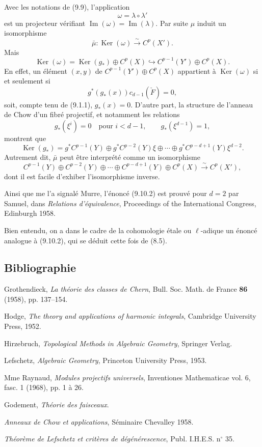 \documentclass[11pt]{article}
\providecommand{\Ker}{\operatorname{Ker}}
\providecommand{\Ker}{\operatorname{Ker}}
\providecommand{\Ker}{\operatorname{Ker}}
\begin{document}
Avec les notations de (9.9), l'application
\[
\omega=\lambda\circ\lambda'
\]
est un projecteur vérifiant $\operatorname{Im}(\omega)=\operatorname{Im}(\lambda)$. Par suite $\mu$ induit un isomorphisme
\[
\bar\mu:\Ker(\omega)\xrightarrow{\sim}C^p(X').
\]
Mais
\[
\Ker(\omega)=\Ker(g_*)\oplus C^p(X)\hookrightarrow C^{p-1}(Y')\oplus C^p(X).
\tag{9.10.1}
\]
En effet, un élément $(x,y)$ de $C^{p-1}(Y')\oplus C^p(X)$ appartient à $\Ker(\omega)$ si et seulement si
\[
g^*(g_*(x))c_{d-1}(\check F)=0,
\]
soit, compte tenu de (9.1.1), $g_*(x)=0$. D'autre part, la structure de l'anneau de Chow d'un fibré projectif, et notamment les relations
\[
g_*(\xi^i)=0\quad\text{pour }i<d-1,\qquad g_*(\xi^{d-1})=1,
\]
montrent que
\[
\Ker(g_*)=g^*C^{p-1}(Y)\oplus g^*C^{p-2}(Y)\xi\oplus\cdots\oplus g^*C^{p-d+1}(Y)\xi^{d-2}.
\]
Autrement dit, $\bar\mu$ peut être interprété comme un isomorphisme
\[
C^{p-1}(Y)\oplus C^{p-2}(Y)\oplus\cdots\oplus C^{p-d+1}(Y)\oplus C^p(X)
\xrightarrow{\sim}C^p(X'),
\tag{9.10.2}
\]
dont il est facile d'exhiber l'isomorphisme inverse.

Ainsi que me l'a signalé Murre, l'énoncé (9.10.2) est prouvé pour $d=2$ par Samuel, dans \emph{Relations d'équivalence}, Proceedings of the International Congress, Edinburgh 1958.

Bien entendu, on a dans le cadre de la cohomologie étale ou $\ell$-adique un énoncé analogue à (9.10.2), qui se déduit cette fois de (8.5).

\subsection*{Bibliographie}

\begin{enumerate}[label={[\arabic*]}]
\item Grothendieck, \emph{La théorie des classes de Chern}, Bull. Soc. Math. de France \textbf{86} (1958), pp. 137--154.
\item Hodge, \emph{The theory and applications of harmonic integrals}, Cambridge University Press, 1952.
\item Hirzebruch, \emph{Topological Methods in Algebraic Geometry}, Springer Verlag.
\item Lefschetz, \emph{Algebraic Geometry}, Princeton University Press, 1953.
\item Mme Raynaud, \emph{Modules projectifs universels}, Inventiones Mathematicae vol. 6, fasc. 1 (1968), pp. 1 à 26.
\item[{[TF]}] Godement, \emph{Théorie des faisceaux}.
\item[{[CH]}] \emph{Anneaux de Chow et applications}, Séminaire Chevalley 1958.
\item[{[6]}] \emph{Théorème de Lefschetz et critères de dégénérescence}, Publ. I.H.E.S. n$^\circ$ 35.
\end{enumerate}
\end{document}
